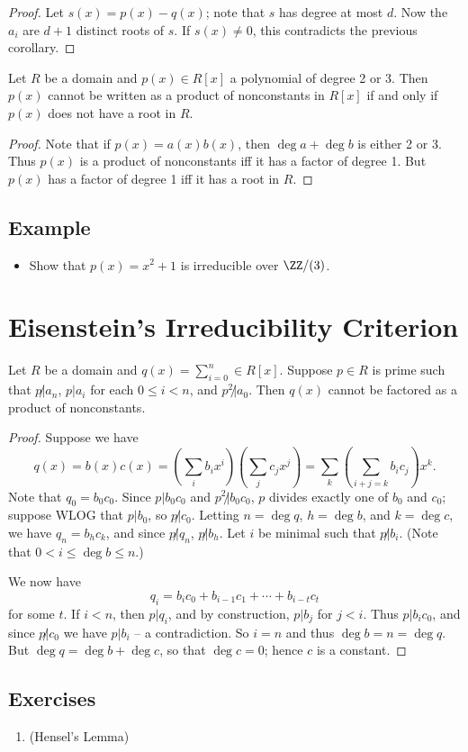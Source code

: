\documentclass{article}
\begin{document}
\begin{proof}
Let $s(x) = p(x) - q(x)$; note that $s$ has degree at most $d$. Now the $a_i$ are $d+1$ distinct roots of $s$. If $s(x) \neq 0$, this contradicts the previous corollary.
\end{proof}

\begin{prop}
Let $R$ be a domain and $p(x) \in R[x]$ a polynomial of degree 2 or 3. Then $p(x)$ cannot be written as a product of nonconstants in $R[x]$ if and only if $p(x)$ does not have a root in $R$.
\end{prop}

\begin{proof}
Note that if $p(x) = a(x)b(x)$, then $\deg{a} + \deg{b}$ is either 2 or 3. Thus $p(x)$ is a product of nonconstants iff it has a factor of degree 1. But $p(x)$ has a factor of degree 1 iff it has a root in $R$.
\end{proof}

\subsection*{Example}

\begin{itemize}
\item Show that $p(x) = x^2 + 1$ is irreducible over $\ZZ/(3)$. 
\end{itemize}

\section{Eisenstein's Irreducibility Criterion}

\begin{prop}
Let $R$ be a domain and $q(x) = \sum_{i=0}^n \in R[x]$. Suppose $p \in R$ is prime such that $p \not| a_n$, $p|a_i$ for each $0 \leq i < n$, and $p^2 \not| a_0$. Then $q(x)$ cannot be factored as a product of nonconstants. 
\end{prop}

\begin{proof}
Suppose we have \[ q(x) = b(x)c(x) = \left(\sum_{i}b_ix^i\right)\left(\sum_{j}c_jx^j\right) = \sum_{k}\left( \sum_{i+j = k}b_ic_j \right)x^k. \] Note that $q_0 = b_0c_0$. Since $p | b_0c_0$ and $p^2 \not| b_0c_0$, $p$ divides exactly one of $b_0$ and $c_0$; suppose WLOG that $p|b_0$, so $p \not| c_0$. Letting $n = \deg{q}$, $h = \deg{b}$, and $k = \deg{c}$, we have $q_n = b_hc_k$, and since $p \not| q_n$, $p \not| b_h$. Let $i$ be minimal such that $p\not|b_i$. (Note that $0 < i \leq \deg{b} \leq n$.)

We now have \[ q_i = b_ic_0 + b_{i-1}c_1 + \cdots + b_{i-t}c_t \] for some $t$. If $i < n$, then $p|q_i$, and by construction, $p|b_j$ for $j < i$. Thus $p|b_ic_0$, and since $p \not| c_0$ we have $p|b_i$ -- a contradiction. So $i = n$ and thus $\deg{b} = n = \deg{q}$. But $\deg{q} = \deg{b} + \deg{c}$, so that $\deg{c} = 0$; hence $c$ is a constant.
\end{proof}

\subsection*{Exercises}

\begin{enumerate}
\item (Hensel's Lemma)
\end{enumerate}
\end{document}
